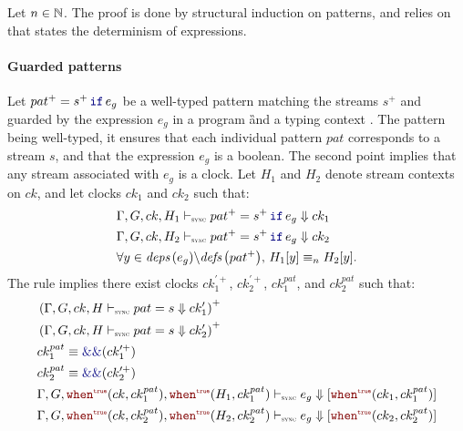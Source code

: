 \begin{skippableproof}
    Let $n \in \mathbb{N}$. The proof is done by structural induction on \GRSync patterns, and
    relies on  that states the determinism of \GRSync
    expressions.

    \paragraph{Guarded patterns}

    Let $\guarded{pat^+ = s^+}{e_g}$ be a well-typed pattern matching the streams $s^+$ and guarded
    by the expression $e_g$ in a program \G and a typing context \tyCtx. The pattern
    being well-typed, it ensures that each individual pattern $pat$ corresponds to a stream $s$, and
    that the expression $e_g$ is a boolean. The second point implies that any stream associated with
    $e_g$ is a clock.
    Let $H_1$ and $H_2$ denote stream contexts on $ck$, and let clocks $ck_1$ and $ck_2$ such that:
    \begin{align*}
         & \patDenot{H_1}{ck}{\guarded{pat^+ = s^+}{e_g}}{ck_1}                         \\
         & \patDenot{H_2}{ck}{\guarded{pat^+ = s^+}{e_g}}{ck_2}                         \\
         & \forall y \in \deps{e_g} \backslash \defs{pat^+}, \, H_1[y] \equiv_n H_2[y].
    \end{align*}
    The rule  implies there exist clocks $ck^{\prime+}_1$,
    $ck^{\prime+}_2$, $ck^{pat}_1$, and $ck^{pat}_2$ such that:
    \begin{align*}
         & \left(\patDenot{H}{ck}{pat = s}{ck'_1}\right)^+                                            \\
         & \left(\patDenot{H}{ck}{pat = s}{ck'_2}\right)^+                                            \\
         & ck^{pat}_1 \equiv \kwf{\&\&}(ck^{\prime+}_1)                                               \\
         & ck^{pat}_2 \equiv \kwf{\&\&}(ck^{\prime+}_2)                                               \\
         & \exprDenot{\whenT{H_1}{ck^{pat}_1}}{\whenT{ck}{ck^{pat}_1}}{e_g}{\whenT{ck_1}{ck^{pat}_1}} \\
         & \exprDenot{\whenT{H_2}{ck^{pat}_2}}{\whenT{ck}{ck^{pat}_2}}{e_g}{\whenT{ck_2}{ck^{pat}_2}} \\

\end{align*}
\end{skippableproof}

